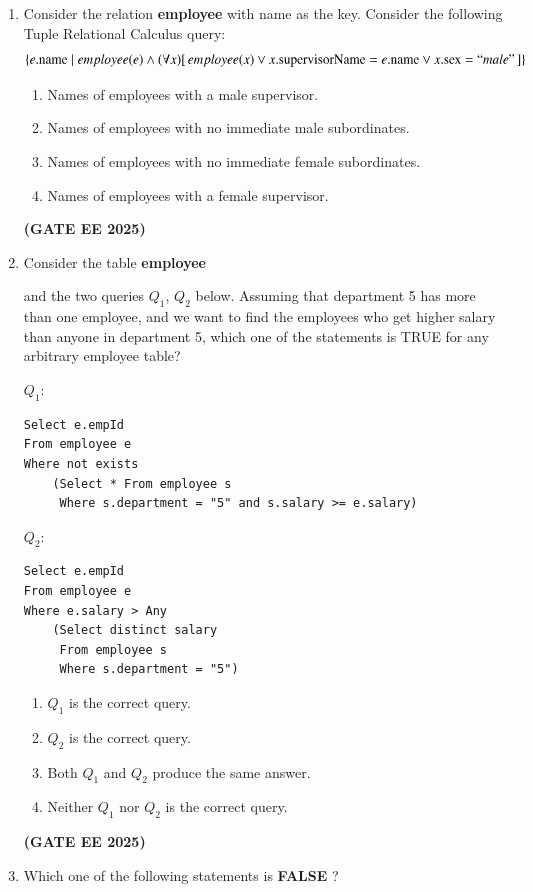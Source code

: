 \documentclass[journal,12pt,onecolumn]{IEEEtran}
\theoremstyle{remark}
\begin{document}
\begin {center}
\begin{enumerate}
\begin{enumerate}
\item  Courses in which all the female students are enrolled. 
\item Courses in which a proper subset of female students are enrolled. 
\item Courses in which only male students are enrolled. 
\item None of the above.
\end{enumerate}
\hfill \textbf{(GATE EE 2025)}
\item Consider the relation 
\textbf{employee}
with name as the key. Consider the following Tuple Relational Calculus query:
\[
\{ e.\text{name} \mid employee(e) \wedge (\forall x) [\, employee(x) \vee x.\text{supervisorName} = e.\text{name} \vee x.\text{sex} = ``male" \,] \}
\]

\begin{enumerate}
\item Names of employees with a male supervisor. 
\item Names of employees with no immediate male subordinates. 
\item  Names of employees with no immediate female subordinates. 
\item Names of employees with a female supervisor.

\end{enumerate}
\hfill \textbf{(GATE EE 2025)}
\item Consider the table 
\textbf{employee}

and the two queries $Q_1$, $Q_2$ below. Assuming that department 5 has more than one employee, and we want to find the employees who get higher salary than anyone in department 5, which one of the statements is TRUE for any arbitrary employee table?


$Q_1$: 
\begin{verbatim}
Select e.empId
From employee e
Where not exists
    (Select * From employee s 
     Where s.department = "5" and s.salary >= e.salary)
\end{verbatim}


$Q_2$:
\begin{verbatim}
Select e.empId
From employee e
Where e.salary > Any
    (Select distinct salary 
     From employee s 
     Where s.department = "5")
\end{verbatim}

\begin{enumerate}
\item $Q_1$ is the correct query.
\item $Q_2$ is the correct query. 
\item  Both $Q_1$ and $Q_2$ produce the same answer. 
\item  Neither $Q_1$ nor $Q_2$ is the correct query.
\end{enumerate}
\hfill \textbf{(GATE EE 2025)}
\item  Which one of the following statements is \textbf{FALSE} ?


\end{enumerate}
\end{center}
\end{document}
